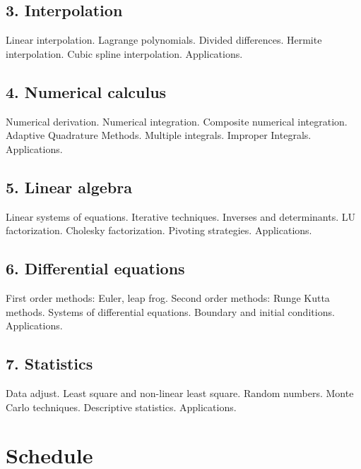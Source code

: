 \documentclass[a4,useAMS,usenatbib,usegraphicx,12pt]{article}
\begin{document}
\subsection*{3. Interpolation}
Linear interpolation. Lagrange polynomials. Divided differences. Hermite 
interpolation. Cubic spline interpolation. Applications.

\subsection*{4. Numerical calculus}
Numerical derivation. Numerical integration. Composite numerical integration.
Adaptive Quadrature Methods. Multiple integrals. Improper Integrals. 
Applications.

\subsection*{5. Linear algebra}
Linear systems of equations. Iterative techniques. Inverses and determinants.
LU factorization. Cholesky factorization. Pivoting strategies. Applications.

\subsection*{6. Differential equations}
First order methods: Euler, leap frog. Second order methods: Runge Kutta methods.
Systems of differential equations. Boundary and initial conditions. Applications.

\subsection*{7. Statistics}
Data adjust. Least square and non-linear least square. Random numbers. Monte 
Carlo techniques. Descriptive statistics. Applications.

\newpage
\section*{Schedule}
\end{document}
